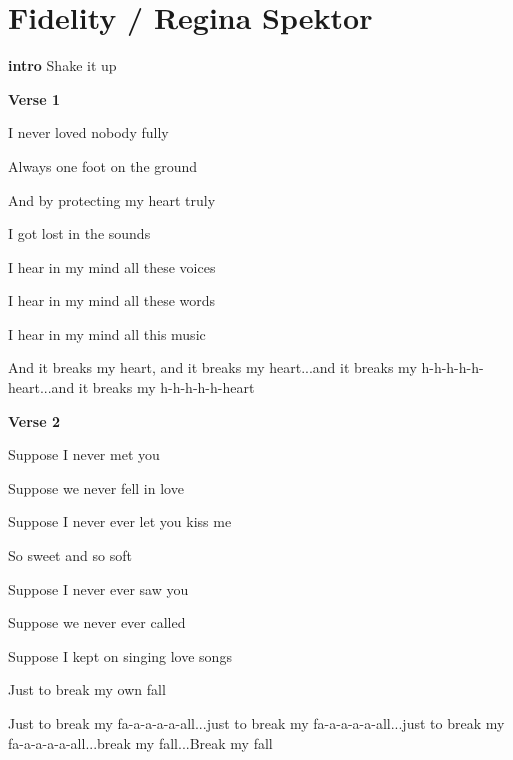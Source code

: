 \section{Fidelity / Regina Spektor}\label{ch:fidelity}
\Gmajor
\Cmajor
\Fmajor
\Aminor
\Dmajor

\textbf{intro}
Shake it up 

\textbf{Verse 1}
                    
I never loved nobody fully
                      
Always one foot on the ground
                          
And by protecting my heart truly
                
I got lost in the sounds
                           
I hear in my mind all these voices
                          
I hear in my mind all these words
                          
I hear in my mind all this music
                 
And it breaks my heart, and it breaks my heart...and it breaks my h-h-h-h-h-heart...and it breaks my h-h-h-h-h-heart

\textbf{Verse 2}
               
Suppose I never met you
                        
Suppose we never fell in love
                    
Suppose I never ever let you kiss me
              
So sweet and so soft
                   
Suppose I never ever saw you
                    
Suppose we never ever called
                        
Suppose I kept on singing love songs
                   
Just to break my own fall
                           
Just to break my fa-a-a-a-a-all...just to break my fa-a-a-a-a-all...just to break my fa-a-a-a-a-all...break my fall...Break my fall

